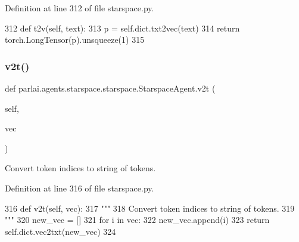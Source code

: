Definition at line 312 of file starspace.\+py.


\begin{DoxyCode}
312     \textcolor{keyword}{def }t2v(self, text):
313         p = self.dict.txt2vec(text)
314         \textcolor{keywordflow}{return} torch.LongTensor(p).unsqueeze(1)
315 
\end{DoxyCode}
\mbox{\label{classparlai_1_1agents_1_1starspace_1_1starspace_1_1StarspaceAgent_a070074c4396b7ea6edc56e190e0c011f}} 
\subsubsection{\texorpdfstring{v2t()}{v2t()}}
{\footnotesize\ttfamily def parlai.\+agents.\+starspace.\+starspace.\+Starspace\+Agent.\+v2t (\begin{DoxyParamCaption}\item[{}]{self,  }\item[{}]{vec }\end{DoxyParamCaption})}

\begin{DoxyVerb}Convert token indices to string of tokens.
\end{DoxyVerb}
 

Definition at line 316 of file starspace.\+py.


\begin{DoxyCode}
316     \textcolor{keyword}{def }v2t(self, vec):
317         \textcolor{stringliteral}{"""}
318 \textcolor{stringliteral}{        Convert token indices to string of tokens.}
319 \textcolor{stringliteral}{        """}
320         new\_vec = []
321         \textcolor{keywordflow}{for} i \textcolor{keywordflow}{in} vec:
322             new\_vec.append(i)
323         \textcolor{keywordflow}{return} self.dict.vec2txt(new\_vec)
324 
\end{DoxyCode}
\mbox{\label{classparlai_1_1agents_1_1starspace_1_1starspace_1_1StarspaceAgent_a87253cca09c8b22848ff0bea7195e32d}} 
